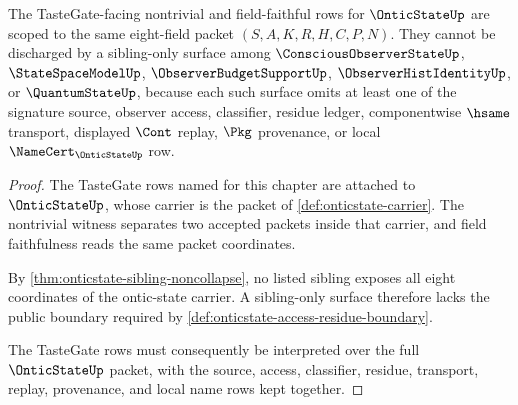 \begin{theorem}
\label{thm:onticstate-tastegate-field-scope}
The TasteGate-facing nontrivial and field-faithful rows for $\OnticStateUp$ are scoped to the same eight-field packet $(S,A,K,R,H,C,P,N)$. They cannot be discharged by a sibling-only surface among $\ConsciousObserverStateUp$, $\StateSpaceModelUp$, $\ObserverBudgetSupportUp$, $\ObserverHistIdentityUp$, or $\QuantumStateUp$, because each such surface omits at least one of the signature source, observer access, classifier, residue ledger, componentwise $\hsame$ transport, displayed $\Cont$ replay, $\Pkg$ provenance, or local $\NameCert_{\OnticStateUp}$ row.
\end{theorem}
\begin{proof}
The TasteGate rows named for this chapter are attached to $\OnticStateUp$, whose carrier is the packet of \autoref{def:onticstate-carrier}. The nontrivial witness separates two accepted packets inside that carrier, and field faithfulness reads the same packet coordinates.

By \autoref{thm:onticstate-sibling-noncollapse}, no listed sibling exposes all eight coordinates of the ontic-state carrier. A sibling-only surface therefore lacks the public boundary required by \autoref{def:onticstate-access-residue-boundary}.

The TasteGate rows must consequently be interpreted over the full $\OnticStateUp$ packet, with the source, access, classifier, residue, transport, replay, provenance, and local name rows kept together.
\end{proof}

